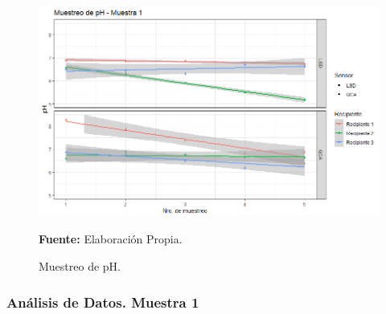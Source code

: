     \begin{figure}[H]
        \centering
        \includegraphics[width=0.7\linewidth]{Imagenes/cap4/pH_M1.png}
        \caption {Muestreo de pH. }{\textbf{Fuente:}
        Elaboraci\'on Propia. }
        \label{fig:M1PH}
    \end{figure}

\subsubsection{An\'alisis de Datos. Muestra 1}

